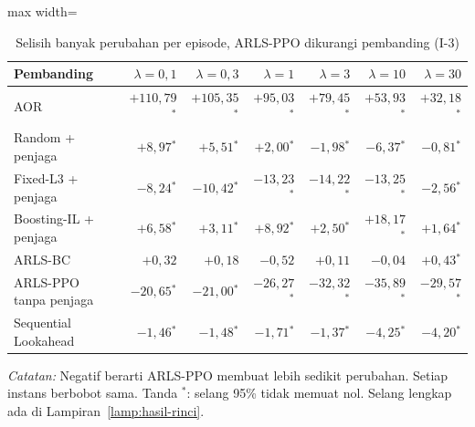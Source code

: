 \begin{table}[htbp]
\caption{Selisih banyak perubahan per episode, ARLS-PPO dikurangi pembanding (I-3)}
\label{tab:uji-perubahan}
\centering\footnotesize
\setlength{\tabcolsep}{4pt}
\begin{adjustbox}{max width=\textwidth}
\begin{tabular}{lrrrrrr}
\toprule
Pembanding & $\lambda=0{,}1$ & $\lambda=0{,}3$ & $\lambda=1$ & $\lambda=3$ & $\lambda=10$ & $\lambda=30$ \\
\midrule
AOR & $+110{,}79$$^{*}$ & $+105{,}35$$^{*}$ & $+95{,}03$$^{*}$ & $+79{,}45$$^{*}$ & $+53{,}93$$^{*}$ & $+32{,}18$$^{*}$ \\
Random + penjaga & $+8{,}97$$^{*}$ & $+5{,}51$$^{*}$ & $+2{,}00$$^{*}$ & $-1{,}98$$^{*}$ & $-6{,}37$$^{*}$ & $-0{,}81$$^{*}$ \\
Fixed-L3 + penjaga & $-8{,}24$$^{*}$ & $-10{,}42$$^{*}$ & $-13{,}23$$^{*}$ & $-14{,}22$$^{*}$ & $-13{,}25$$^{*}$ & $-2{,}56$$^{*}$ \\
Boosting-IL + penjaga & $+6{,}58$$^{*}$ & $+3{,}11$$^{*}$ & $+8{,}92$$^{*}$ & $+2{,}50$$^{*}$ & $+18{,}17$$^{*}$ & $+1{,}64$$^{*}$ \\
ARLS-BC & $+0{,}32$ & $+0{,}18$ & $-0{,}52$ & $+0{,}11$ & $-0{,}04$ & $+0{,}43$$^{*}$ \\
ARLS-PPO tanpa penjaga & $-20{,}65$$^{*}$ & $-21{,}00$$^{*}$ & $-26{,}27$$^{*}$ & $-32{,}32$$^{*}$ & $-35{,}89$$^{*}$ & $-29{,}57$$^{*}$ \\
Sequential Lookahead & $-1{,}46$$^{*}$ & $-1{,}48$$^{*}$ & $-1{,}71$$^{*}$ & $-1{,}37$$^{*}$ & $-4{,}25$$^{*}$ & $-4{,}20$$^{*}$ \\
\bottomrule
\end{tabular}
\end{adjustbox}
\par\smallskip\footnotesize\textit{Catatan:} Negatif berarti ARLS-PPO membuat lebih sedikit perubahan. Setiap instans berbobot sama. Tanda $^{*}$: selang 95\% tidak memuat nol. Selang lengkap ada di Lampiran~\ref{lamp:hasil-rinci}.
\end{table}
